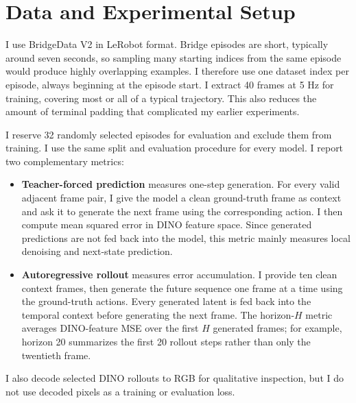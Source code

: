 \documentclass[10pt,a4paper]{article}
\begin{document}
\section{Data and Experimental Setup}

I use BridgeData V2 \cite{walke2023bridgedatav2} in LeRobot format. Bridge episodes are short, typically around seven seconds, so sampling many starting indices from the same episode would produce highly overlapping examples. I therefore use one dataset index per episode, always beginning at the episode start. I extract 40 frames at 5 Hz for training, covering most or all of a typical trajectory. This also reduces the amount of terminal padding that complicated my earlier experiments.

I reserve 32 randomly selected episodes for evaluation and exclude them from training. I use the same split and evaluation procedure for every model. I report two complementary metrics:
\begin{itemize}
    \item \textbf{Teacher-forced prediction} measures one-step generation. For every valid adjacent frame pair, I give the model a clean ground-truth frame as context and ask it to generate the next frame using the corresponding action. I then compute mean squared error in DINO feature space. Since generated predictions are not fed back into the model, this metric mainly measures local denoising and next-state prediction.
    \item \textbf{Autoregressive rollout} measures error accumulation. I provide ten clean context frames, then generate the future sequence one frame at a time using the ground-truth actions. Every generated latent is fed back into the temporal context before generating the next frame. The horizon-$H$ metric averages DINO-feature MSE over the first $H$ generated frames; for example, horizon 20 summarizes the first 20 rollout steps rather than only the twentieth frame.
\end{itemize}
I also decode selected DINO rollouts to RGB for qualitative inspection, but I do not use decoded pixels as a training or evaluation loss.
\end{document}
